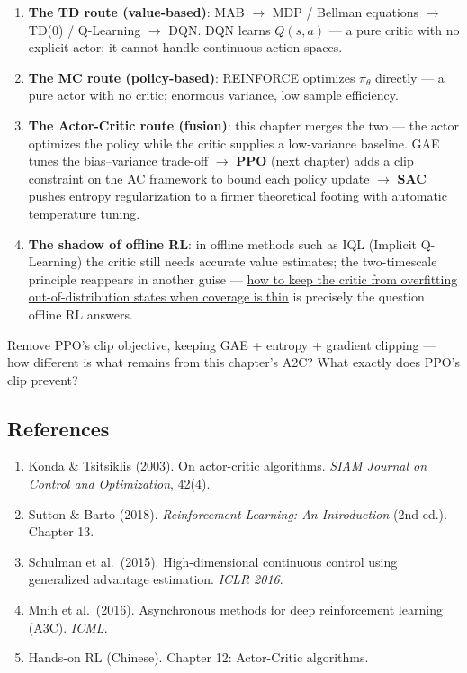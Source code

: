 \documentclass{article}
\begin{document}
\begin{enumerate}
  \item \textbf{The TD route (value-based)}: MAB $\to$ MDP / Bellman equations $\to$ TD(0) / Q-Learning $\to$ DQN. DQN learns $Q(s,a)$ --- a pure critic with no explicit actor; it cannot handle continuous action spaces.

  \item \textbf{The MC route (policy-based)}: REINFORCE optimizes $\pi_\theta$ directly --- a pure actor with no critic; enormous variance, low sample efficiency.

  \item \textbf{The Actor-Critic route (fusion)}: this chapter merges the two --- the actor optimizes the policy while the critic supplies a low-variance baseline. GAE tunes the bias--variance trade-off $\to$ \textbf{PPO} (next chapter) adds a clip constraint on the AC framework to bound each policy update $\to$ \textbf{SAC} pushes entropy regularization to a firmer theoretical footing with automatic temperature tuning.

  \item \textbf{The shadow of offline RL}: in offline methods such as IQL (Implicit Q-Learning) the critic still needs accurate value estimates; the two-timescale principle reappears in another guise --- \underline{how to keep the critic from overfitting out-of-distribution states when coverage is thin} is precisely the question offline RL answers.
\end{enumerate}

Remove PPO's clip objective, keeping GAE + entropy + gradient clipping --- how different is what remains from this chapter's A2C? What exactly does PPO's clip prevent?

\subsection*{References}

\begin{enumerate}
  \item Konda \& Tsitsiklis (2003). On actor-critic algorithms. \textit{SIAM Journal on Control and Optimization}, 42(4).
  \item Sutton \& Barto (2018). \textit{Reinforcement Learning: An Introduction} (2nd ed.). Chapter 13.
  \item Schulman et al.\ (2015). High-dimensional continuous control using generalized advantage estimation. \textit{ICLR 2016}.
  \item Mnih et al.\ (2016). Asynchronous methods for deep reinforcement learning (A3C). \textit{ICML}.
  \item Hands-on RL (Chinese). Chapter 12: Actor-Critic algorithms.
\end{enumerate}
\end{document}
